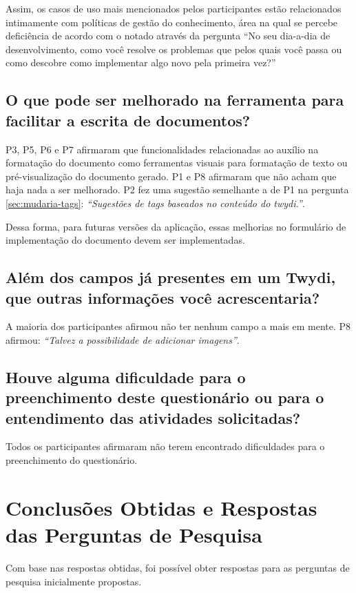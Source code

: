Assim, os casos de uso mais mencionados pelos participantes estão relacionados intimamente com políticas de gestão do conhecimento, área na qual se percebe deficiência de acordo com o notado através da pergunta ``No seu dia-a-dia de desenvolvimento, como você resolve os problemas que pelos quais você passa ou como descobre como implementar algo novo pela primeira vez?''

\subsection{O que pode ser melhorado na ferramenta para facilitar a escrita de documentos?}

P3, P5, P6 e P7 afirmaram que funcionalidades relacionadas ao auxílio na formatação do documento como ferramentas visuais para formatação de texto ou pré-visualização do documento gerado. P1 e P8 afirmaram que não acham que haja nada a ser melhorado. P2 fez uma sugestão semelhante a de P1 na pergunta \ref{sec:mudaria-tags}: \textit{``Sugestões de tags baseados no conteúdo do twydi.''}.

Dessa forma, para futuras versões da aplicação, essas melhorias no formulário de implementação do documento devem ser implementadas.

\subsection{Além dos campos já presentes em um Twydi, que outras informações você acrescentaria?}

A maioria dos participantes afirmou não ter nenhum campo a mais em mente. P8 afirmou: \textit{``Talvez a possibilidade de adicionar imagens''}.

\subsection{Houve alguma dificuldade para o preenchimento deste questionário ou para o entendimento das atividades solicitadas?}

Todos os participantes afirmaram não terem encontrado dificuldades para o preenchimento do questionário.

\section{Conclusões Obtidas e Respostas das Perguntas de Pesquisa}

Com base nas respostas obtidas, foi possível obter respostas para as perguntas de pesquisa inicialmente propostas.

